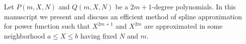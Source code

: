 ﻿Let $P(m, X, N)$ and $Q(m, X, N)$ be a $2m+1$-degree polynomials.
In this manuscript we present and discuss an efficient method of spline approximation
for power function such that $X^{2m+1}$ and $X^{2m}$
are approximated in some neighborhood $a \leq X \leq b$ having fixed $N$ and $m$.
